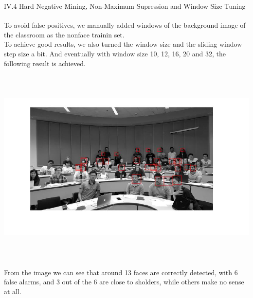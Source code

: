 \documentclass[12pt]{article}
\newenvironment{p3}[2][IV Realboost for Face Detection]{\begin{trivlist}
\item[\hskip \labelsep {\bfseries #1}\hskip \labelsep {\bfseries #2}]}{\end{trivlist}}
\begin{document}
\begin{p3}{}
\item{IV.4 Hard Negative Mining, Non-Maximum Supression and Window Size Tuning\\\\}
To avoid false positives, we manually added windows of the background image of the classroom as the nonface trainin set. \\
To achieve good results, we also turned the window size and the sliding window step size a bit. And eventually with window size 10, 12, 16, 20 and 32, the following result is achieved.
\begin{center}
		\includegraphics[height=10cm]{data/final.jpg}
\end{center}
From the image we can see that around 13 faces are correctly detected, with 6 false alarms, and 3 out of the 6 are close to sholders, while others make no sense at all.
\end{p3}{}

 
\end{document}
